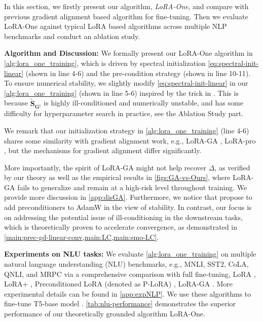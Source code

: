 In this section, we firstly present our  algorithm, \emph{LoRA-One},  and compare with previous gradient alignment based algorithm for fine-tuning.
Then we evaluate LoRA-One against typical LoRA based algorithms across multiple NLP benchmarks and conduct an ablation study.\medskip


\noindent
{\bf Algorithm and Discussion:}
We formally present our LoRA-One algorithm in \cref{alg:lora_one_training}, which is driven by spectral initialization \eqref{eq:spectral-init-linear} (shown in line 4-6) and the pre-condition strategy (shown in line 10-11).
To ensure numerical stability, we slightly modify \eqref{eq:spectral-init-linear} in our \cref{alg:lora_one_training} (shown in line 5-6) inspired by the trick in \cite{wang2024lora}. This is because $\widetilde{\bm S}_{\bm G^\natural}$ is highly ill-conditioned and numerically unstable, and has some difficulty for hyperparameter search in practice, see the Ablation Study part. 

We remark that our initialization strategy in \cref{alg:lora_one_training} (line 4-6) shares some similarity with gradient alignment work, e.g., LoRA-GA \citep{wang2024lora}, LoRA-pro \citep{wang2024lorapro}, but the mechanisms for gradient alignment differ significantly. 

More importantly, the spirit of LoRA-GA might not help recover $\Delta$, as verified by our theory as well as the empirical results in \cref{figs:GA-vs-Ours}, where LoRA-GA fails to generalize and remain at a high-risk level throughout training. We provide more discussion in \cref{app:disGA}. Furthermore, we notice that \cite{zhang2024riemannian} propose to add preconditioners to AdamW \citep{loshchilov2017decoupled} in the view of stability. In contrast, our focus is on addressing the potential issue of ill-conditioning in the downstream tasks, which is theoretically proven to accelerate convergence, as demonstrated in \cref{main:prec-gd-linear-conv,main:LC,main:smo-LC}.\medskip

\noindent
{\bf Experiments on NLU tasks:} We evaluate \cref{alg:lora_one_training} on multiple natural language understanding (NLU) benchmarks, e.g., MNLI, SST2, CoLA, QNLI, and MRPC via a comprehensive comparison with full fine-tuning, LoRA \citep{hu2022lora}, LoRA+ \citep{hayou2024lora+}, Preconditioned LoRA (denoted as P-LoRA) \citep{zhang2024riemannian}, LoRA-GA \citep{wang2024lora}. More experimental details can be found in \cref{app:expNLP}. 
We use these algorithms to fine-tune T5-base model \citep{raffel2020exploring}. \cref{tab:nlu-performance} demonstrates the superior performance of our theoretically grounded algorithm LoRA-One.\medskip

